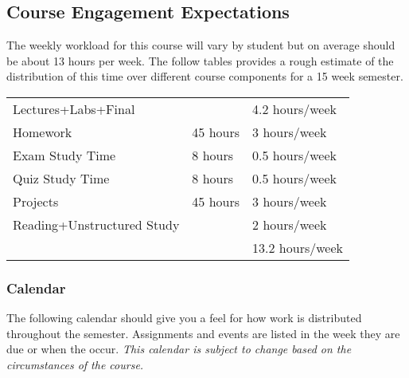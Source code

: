 \documentclass[10pt]{article}
\begin{document}
\subsection{Course Engagement Expectations}

The weekly workload for this course will vary by student but on average should be about 13 hours per week.  The follow tables provides a rough estimate of the distribution of this time over different course components for a 15 week semester. 
\begin{center}
\begin{tabular}{|l|l|l|}
\hline
Lectures+Labs+Final &      & 4.2 hours/week \\ 
Homework & 45 hours        & 3 hours/week \\
Exam Study Time & 8 hours  & 0.5 hours/week \\ 
Quiz Study Time & 8 hours & 0.5 hours/week \\
Projects & 45 hours        & 3 hours/week \\
Reading+Unstructured Study & & 2 hours/week \\
\hline
& & 13.2 hours/week \\ 
\hline
\end{tabular}
\end{center}

\subsubsection{Calendar}

The following calendar should give you a feel for how work is distributed throughout the semester.  Assignments and events are listed in the week they are due or when the occur. \textit{This calendar is subject to change based on the circumstances of the course.}
\end{document}
